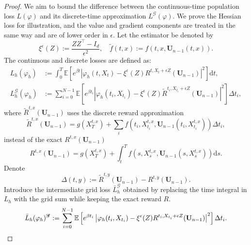 \documentclass[10pt,a4paper]{amsart}
\newcommand{\E}{\mathbb{E}}
\newcommand{\bU}{\mathbf{U}}
\newcommand{\dd}{\mathrm{d}}
\begin{document}
\begin{proof}
    We aim to bound the difference between the continuous-time population loss $L(\varphi)$ and its discrete-time approximation $L^{\mathcal{G}}(\varphi)$. We prove the Hessian loss for illustration, and the value and gradient components are treated in the same way and are of lower order in $\epsilon$. Let the estimator be denoted by
\begin{equation}
    \xi^\epsilon(Z) := \frac{ZZ^\top - I_d}{\epsilon^2},\quad \tilde f(t,x):=f(t,x,\mathbf U_{n-1}(t,x)).
\end{equation}
The continuous and discrete losses are defined as:
\begin{align}
    L_h(\varphi_h) &:=  \int_0^T \E \left[ e^{\beta t} \left| \varphi_h(t, X_t) - \xi^\epsilon(Z)R^{t, X_t+\epsilon Z}(\mathbf{U}_{n-1}) \right|^2 \right] \dd t, \\
    L_h^{\mathcal{G}}(\varphi_h) &:=  \sum_{i=0}^{N-1} \E \left[ e^{\beta t_i} \left| \varphi_h(t_i, X_{t_i}) - \xi^\epsilon(Z) \tilde R^{t_i, X_{t_i}+\epsilon Z}(\mathbf{U}_{n-1}) \right|^2 \right] \Delta t_i,
\end{align}
where $\tilde R^{t,x}(\bU_{n-1})$ uses the discrete reward approximation
\begin{equation}
    \tilde R^{t,x}(\bU_{n-1}) = g(X_T^{t,x}) + \sum_i f(t_i,X_{t_i}^{t,x},\bU_{n-1}(t_i,X_{t_i}^{t,x}))\Delta t_i,
\end{equation}
instead of the exact $R^{t,x}(\bU_{n-1})$
\begin{equation}
    R^{t,x}(\bU_{n-1}) = g(X_T^{t,x}) + \int_t^{T} f(s,X_s^{t,x},\bU_{n-1}(s,X_{s}^{t,x}))\dd s.
\end{equation}
Denote
\[
    \Delta(t,y)
    :=
    \tilde R^{t,y}(\mathbf U_{n-1})
    -
    R^{t,y}(\mathbf U_{n-1}).
\]
Introduce the intermediate grid loss $\bar L_h^{\mathscr G}$ obtained by
replacing the time integral in $L_h$ with the grid sum while keeping the exact
reward $R$.
\begin{equation}
    \Bar{L}_h(\varphi_h)^{\mathscr{G}} :=   \sum_{i=0}^{N-1} \E \left[ e^{\beta t_i} \left| \varphi_h(t_i, X_{t_i}) - \xi^\epsilon(Z)  R^{t_i, X_{t_i}+\epsilon Z}(\mathbf{U}_{n-1}) \right|^2 \right] \Delta t_i.
\end{equation}


\end{proof}
\end{document}

